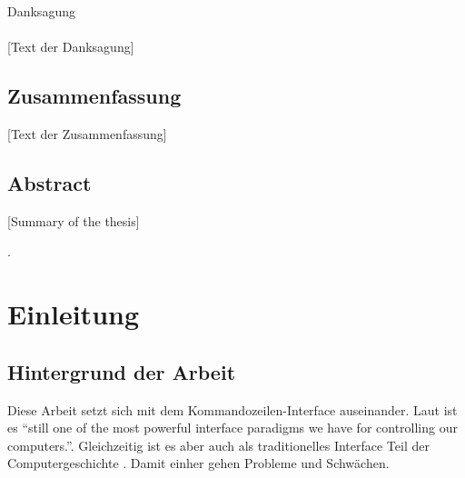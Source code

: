 \documentclass[oneside,bibliography=totocnumbered,BCOR=5mm]{scrbook}
\begin{document}
\thispagestyle{empty}
\vspace*{2.2cm}
\noindent
{\Huge Danksagung}\\
\vspace*{1.6cm} \\


[Text der Danksagung]

\newpage
\thispagestyle{empty}
\section*{Zusammenfassung}
[Text der Zusammenfassung]

\section*{Abstract}
[Summary of the thesis]


\clearpage

\tableofcontents
.
\newpage



\chapter{Einleitung}
\label{sec:einleitung}

\section{Hintergrund der Arbeit}

Diese Arbeit setzt sich mit dem Kommandozeilen-Interface auseinander. Laut
\cite{Raskin_2008} ist es ``still one of the most powerful interface paradigms
we have for controlling our computers.''. Gleichzeitig ist es aber auch als
traditionelles Interface Teil der Computergeschichte \parencite{nielson1993}.
Damit einher gehen Probleme und Schwächen.
\end{document}
